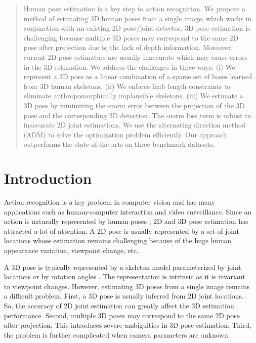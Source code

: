 \documentclass[10pt,twocolumn,letterpaper]{article}
\begin{document}
\begin{abstract}
Human pose estimation is a key step to action recognition. We propose a method of estimating 3D human poses from a single image, which works in conjunction with an existing 2D pose/joint detector. 3D pose estimation is challenging because multiple 3D poses may correspond to the same 2D pose after projection due to the lack of depth information. Moreover, current 2D pose estimators are usually inaccurate which may cause errors in the 3D estimation. We address the challenges in three ways: (i) We represent a 3D pose as a linear combination of a sparse set of bases learned from 3D human skeletons. (ii) We enforce limb length constraints to eliminate anthropomorphically implausible skeletons. (iii) We estimate a 3D pose by minimizing the -norm error between the projection of the 3D pose and the corresponding 2D detection. The -norm loss term is robust to inaccurate 2D joint estimations. We use the alternating direction method (ADM) to solve the optimization problem efficiently. Our approach outperforms the state-of-the-arts on three benchmark datasets.
\end{abstract}



\section{Introduction}
Action recognition is a key problem in computer vision \cite{wang2011mining} and has many applications such as human-computer interaction and video surveillance. Since an action is naturally represented by human poses \cite{ChunyuCVPR13}, 2D and 3D pose estimation has attracted a lot of attention. A 2D pose is usually represented by a set of joint locations \cite{Yang2D} whose estimation remains challenging because of the huge human appearance variation, viewpoint change, etc.

A 3D pose is typically represented by a skeleton model parameterized by joint locations \cite{Taylor} or by rotation angles \cite{lee2009human}. The representation is intrinsic as it is invariant to viewpoint changes. However, estimating 3D poses from a single image remains a difficult problem. First, a 3D pose is usually inferred from 2D joint locations. So, the accuracy of 2D joint estimation can greatly affect the 3D estimation performance. Second, multiple 3D poses may correspond to the same 2D pose after projection. This introduces severe ambiguities in 3D pose estimation. Third, the problem is further complicated when camera parameters are unknown.
\end{document}
